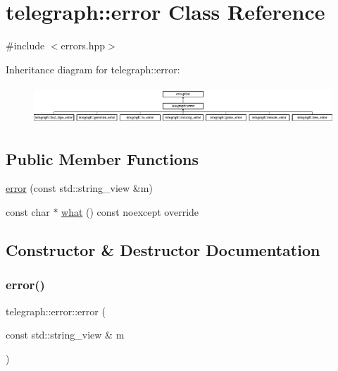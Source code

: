 \hypertarget{classtelegraph_1_1error}{}\section{telegraph\+:\+:error Class Reference}
\label{classtelegraph_1_1error}


{\ttfamily \#include $<$errors.\+hpp$>$}

Inheritance diagram for telegraph\+:\+:error\+:\begin{figure}[H]
\begin{center}
\leavevmode
\includegraphics[height=1.437126cm]{classtelegraph_1_1error}
\end{center}
\end{figure}
\subsection*{Public Member Functions}
\begin{DoxyCompactItemize}
\item 
\hyperlink{classtelegraph_1_1error_a2381d26711bfbcb841ccd3c7e562b9f8}{error} (const std\+::string\+\_\+view \&m)
\item 
const char $\ast$ \hyperlink{classtelegraph_1_1error_acd75a8954a9d693faf75eb5918bfe044}{what} () const noexcept override
\end{DoxyCompactItemize}


\subsection{Constructor \& Destructor Documentation}
\mbox{\label{classtelegraph_1_1error_a2381d26711bfbcb841ccd3c7e562b9f8}} 
\subsubsection{\texorpdfstring{error()}{error()}}
{\footnotesize\ttfamily telegraph\+::error\+::error (\begin{DoxyParamCaption}\item[{const std\+::string\+\_\+view \&}]{m }\end{DoxyParamCaption})\hspace{0.3cm}{\ttfamily [inline]}}



